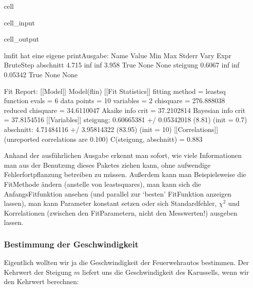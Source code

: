 \documentclass[letterpaper,10pt,english]{jupyterBook}
\begin{document}
\begin{sphinxuseclass}{cell}
\begin{sphinxVerbatimInput}
\begin{sphinxuseclass}{cell_input}
\end{sphinxuseclass}\end{sphinxVerbatimInput}
\begin{sphinxVerbatimOutput}

\begin{sphinxuseclass}{cell_output}
\begin{sphinxVerbatim}[commandchars=\\\{\}]
lmfit hat eine eigene print\PYGZhy{}Ausgabe:
Name          Value      Min      Max   Stderr     Vary     Expr Brute\PYGZus{}Step
abschnitt     4.715     \PYGZhy{}inf      inf    3.958     True     None     None
steigung     0.6067     \PYGZhy{}inf      inf  0.05342     True     None     None

Fit Report:
[[Model]]
    Model(f\PYGZus{}lin)
[[Fit Statistics]]
    \PYGZsh{} fitting method   = leastsq
    \PYGZsh{} function evals   = 6
    \PYGZsh{} data points      = 10
    \PYGZsh{} variables        = 2
    chi\PYGZhy{}square         = 276.888038
    reduced chi\PYGZhy{}square = 34.6110047
    Akaike info crit   = 37.2102814
    Bayesian info crit = 37.8154516
[[Variables]]
    steigung:   0.60665381 +/\PYGZhy{} 0.05342018 (8.81\PYGZpc{}) (init = 0.7)
    abschnitt:  4.71484116 +/\PYGZhy{} 3.95814322 (83.95\PYGZpc{}) (init = 10)
[[Correlations]] (unreported correlations are \PYGZlt{} 0.100)
    C(steigung, abschnitt) = \PYGZhy{}0.883
\end{sphinxVerbatim}

\noindent{}

\end{sphinxuseclass}\end{sphinxVerbatimOutput}

\end{sphinxuseclass}
\sphinxAtStartPar
Anhand der ausführlichen Ausgabe erkennt man sofort, wie viele Informationen man aus der Benutzung dieses Paketes ziehen kann, ohne aufwendige Fehlerfortpflanzung betreiben zu müssen. Außerdem kann man Beispielsweise die Fit\sphinxhyphen{}Methode ändern (anstelle von least\sphinxhyphen{}squares), man kann sich die Anfangs\sphinxhyphen{}Fitfunktion ansehen (und parallel zur ‘besten’ Fit\sphinxhyphen{}Funktion anzeigen lassen), man kann Parameter konstant setzen oder sich Standardfehler, \(\chi^2\) und Korrelationen (zwischen den Fit\sphinxhyphen{}Parametern, nicht den Messwerten!) ausgeben lassen.


\subsubsection{Bestimmung der Geschwindigkeit }
\label{\detokenize{content/1_Kurvenanpassung:bestimmung-der-geschwindigkeit-a-id-subsec-geschwindigkeit-a}}
\sphinxAtStartPar
Eigentlich wollten wir ja die Geschwindigkeit der Feuerwehrautos bestimmen.
Der Kehrwert der Steigung \(m\) liefert uns die Geschwindigkeit des Karussells, wenn wir den Kehrwert berechnen:
\end{document}
